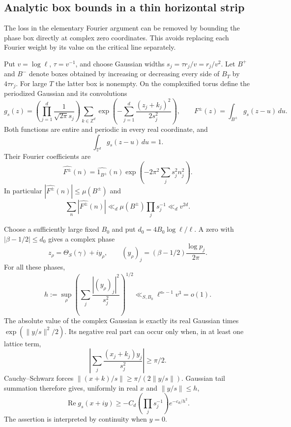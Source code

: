\documentclass[11pt,letterpaper]{article}
\theoremstyle{definition}
\theoremstyle{remark}
\renewcommand{\Re}{\operatorname{Re}}
\newcommand{\1}{\mathbf 1}
\begin{document}
\subsection{Analytic box bounds in a thin horizontal strip}

The loss in the elementary Fourier argument can be removed by
bounding the phase box directly at complex zero coordinates.  This
avoids replacing each Fourier weight by its value on the critical
line separately.

Put $v=\log\ell$, $\tau=v^{-1}$, and choose Gaussian widths
$s_j=\tau r_j/v=r_j/v^2$. Let $B^+$ and $B^-$ denote boxes obtained
by increasing or decreasing every side of $B_T$ by $4\tau r_j$.
For large $T$ the latter box is nonempty.  On the complexified torus
define the periodized Gaussian and its convolutions
\[
 g_s(z)=\left(\prod_{j=1}^d\frac1{\sqrt{2\pi}s_j}\right)
       \sum_{k\in\mathbb Z^d}
          \exp\left(-\sum_{j=1}^d
                         \frac{(z_j+k_j)^2}{2s_j^2}\right),
 \qquad F^\pm(z)=\int_{B^\pm}g_s(z-u)\,du.
\]
Both functions are
entire and periodic in every real coordinate, and
\[
 \int_{\mathbb T^d}g_s(z-u)\,du=1.
\]
Their Fourier coefficients are
\[
 \widehat{F^\pm}(n)=\widehat{1_{B^\pm}}(n)
                    \exp\left(-2\pi^2\sum_js_j^2n_j^2\right).
\]
In particular $|\widehat{F^\pm}(n)|\le\mu(B^\pm)$ and
\begin{equation}\label{p04:eq:Gaussian-coefficient-mass}
 \sum_n|\widehat{F^\pm}(n)|
       \ll_d\mu(B^\pm)\prod_js_j^{-1}\ll_d v^{2d}.
\end{equation}

Choose a sufficiently large fixed $B_0$ and put
$d_0=4B_0\log\ell/\ell$.  A zero with
$|\beta-1/2|\le d_0$ gives a complex phase
\[
 z_\rho=\Theta_S(\gamma)+iy_\rho,
 \qquad (y_\rho)_j=(\beta-1/2)\frac{\log p_j}{2\pi}.
\]
For all these phases,
\[
 h:=\sup_\rho\left(\sum_j\frac{|(y_\rho)_j|^2}{s_j^2}
                                                    \right)^{1/2}
       \ll_{S,B_0}\ell^{a_*-1}v^3=o(1).
\]
The absolute value of the complex Gaussian is exactly its real
Gaussian times $\exp(\|y/s\|^2/2)$.  Its negative real part can
occur only when, in at least one lattice term,
\[
 \left|\sum_j\frac{(x_j+k_j)y_j}{s_j^2}\right|\ge\pi/2.
\]
Cauchy--Schwarz forces
$\|(x+k)/s\|\ge\pi/(2\|y/s\|)$. Gaussian tail summation
therefore gives, uniformly in real $x$ and $\|y/s\|\le h$,
\begin{equation}\label{p04:eq:Gaussian-negative-tail}
 \Re g_s(x+iy)\ge
       -C_d\left(\prod_js_j^{-1}\right)e^{-c_d/h^2}.
\end{equation}
The assertion is interpreted by continuity when $y=0$.
\end{document}
